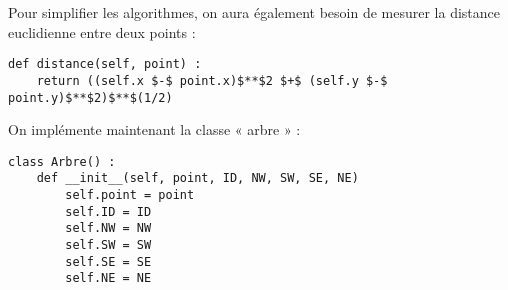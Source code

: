 \documentclass{report}
\begin{document}
Pour simplifier les algorithmes, on aura également besoin de mesurer la distance euclidienne entre deux points :
\begin{lstlisting}
def distance(self, point) :
	return ((self.x $-$ point.x)$**$2 $+$ (self.y $-$ point.y)$**$2)$**$(1/2)
\end{lstlisting}


On implémente maintenant la classe « arbre » :
\begin{lstlisting}
class Arbre() :
	def __init__(self, point, ID, NW, SW, SE, NE)
		self.point = point
		self.ID = ID
		self.NW = NW
		self.SW = SW
		self.SE = SE
		self.NE = NE
\end{lstlisting}
\end{document}
